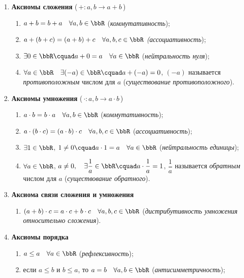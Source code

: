 \begin{enumerate}[label=\Roman*.]
\item
\textbf{Аксиомы сложения} (\,$+\colon a,b \to a+b$\,)
\begin{enumerate}[label=\arabic*.]
\item 
$a + b = b + a\quad\forall a,b \in \bbR$ (\textit{коммутативность});
\item
$a + (b + c) = (a + b) + c\quad \forall a,b,c \in \bbR$ \textit{(ассоциативность});
\item
$\exists 0 \in \bbR\cquad a + 0 = a\quad \forall a \in \bbR$ (\textit{нейтральность нуля});
\item 
$\forall a \in \bbR \quad \exists (-a) \in \bbR\cquad a + (-a) = 0$, $(-a)$ называется \textit{противоположным} числом для $a$ (\textit{существование противоположного}).
\end{enumerate}
\item
\textbf{Аксиомы умножения} (\,$\cdot\colon a,b \to a\cdot b$\,)
\begin{enumerate}[resume, label=\arabic*.]
\item
$a\cdot b = b \cdot a \quad \forall a,b\in \bbR$ (\textit{коммутативность});
\item
$a \cdot (b \cdot c) = (a \cdot b) \cdot c\quad \forall a,b,c \in \bbR$ (\textit{ассоциативность});
\item 
$\exists 1 \in \bbR$, $1\ne 0\cquad a\cdot1 = a\quad \forall a\in \bbR$ (\textit{нейтральность единицы});
\item 
$\forall a\in \bbR$, $a\ne 0,\quad \exists \dfrac{1}{a} \in \bbR\cquad a\cdot \dfrac{1}{a} = 1$, $\dfrac{1}{a}$ называется \textit{обратным} числом для $a$ (\textit{существование обратного}).
\end{enumerate}
\item
\textbf{Аксиома связи сложения и умножения}
\begin{enumerate}[resume, label=\arabic*.]
\item
$(a+b) \cdot c = a\cdot c +  b\cdot c\quad \forall a,b,c \in \bbR$ (\textit{дистрибутивность умножения относительно сложения}).
\end{enumerate}
\item
\textbf{Аксиомы порядка} 
\begin{enumerate}[resume, label=\arabic*.]
\item 
$ a \le a\quad \forall a \in \bbR$ (\textit{рефлексивность});
\item
если $ a\le b$ и $b\le a$, то $a=b \quad \forall a,b\in\bbR$ (\textit{антисимметричность});

\end{enumerate}
\end{enumerate}
